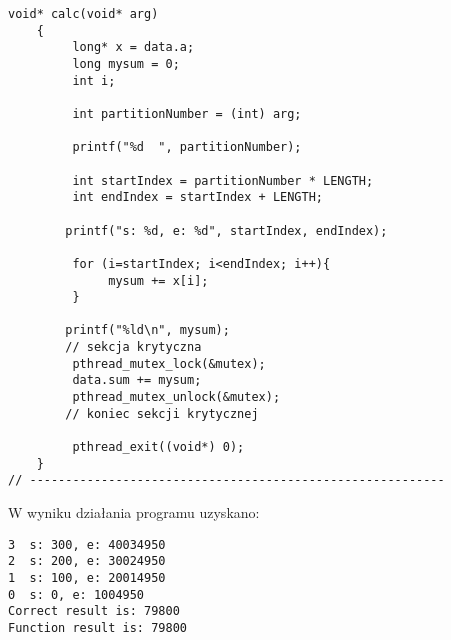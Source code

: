 \documentclass[a4paper,15pt]{article}
\begin{document}
\begin{lstlisting}[style=CStyle, label=some-code, caption=Zadanie 3 - func.c]
    void* calc(void* arg)
    {
         long* x = data.a;
         long mysum = 0;
         int i;

         int partitionNumber = (int) arg;

         printf("%d  ", partitionNumber);

         int startIndex = partitionNumber * LENGTH;
         int endIndex = startIndex + LENGTH;
 
        printf("s: %d, e: %d", startIndex, endIndex);

         for (i=startIndex; i<endIndex; i++){
              mysum += x[i];
         }
     
        printf("%ld\n", mysum);
        // sekcja krytyczna
         pthread_mutex_lock(&mutex);
         data.sum += mysum;
         pthread_mutex_unlock(&mutex);
        // koniec sekcji krytycznej
     
         pthread_exit((void*) 0);
    }
// ----------------------------------------------------------
\end{lstlisting}

W wyniku działania programu uzyskano: 
\begin{lstlisting}[style=CStyle, label=some-code, caption=Zadanie 3 - func.c - wynik dzialania]
3  s: 300, e: 40034950
2  s: 200, e: 30024950
1  s: 100, e: 20014950
0  s: 0, e: 1004950
Correct result is: 79800 
Function result is: 79800 
\end{lstlisting}



\newpage
\end{document}
